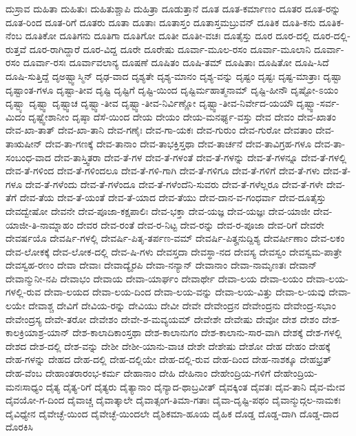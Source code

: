 {ದುಸ್ರಾವ
ದುಹಿತಾ
ದುಹಿತುಃ
ದುಹಿತುಶ್ಚಾಪಿ
ದುಹಿತ್ರಾ
ದೂಡುತ್ತಾನೆ
ದೂತ
ದೂತ-ಕರ್ಮಾಣಂ
ದೂತರ
ದೂತ-ರನ್ನು
ದೂತ-ರಿಂದ
ದೂತ-ರಿಗೆ
ದೂತರು
ದೂತಾ
ದೂತಾಃ
ದೂತಾಸ್ತಂ
ದೂತಾಸ್ತಮಬ್ರುವನ್
ದೂತಿಕ
ದೂತಿ-ಕನು
ದೂತಿಕ-ನೆಂಬ
ದೂತಿಕೋ
ದೂತಿಗನು
ದೂತಿಗಾ
ದೂತಿಗೋ
ದೂತೀ
ದೂತೀ-ವಚಃ
ದೂತೈಸ್ತು
ದೂರ
ದೂರ-ದಲ್ಲಿ
ದೂರ-ದಲ್ಲಿ-ರುತ್ತವೆ
ದೂರ-ರಾಗಿದ್ದಾರೆ
ದೂರ-ವಿದ್ದ
ದೂರೇ
ದೂರೇಷು
ದೂರ್ವಾ-ಮೂಲ-ರಸಂ
ದೂರ್ವಾ-ಮೂಲಾನಿ
ದೂರ್ವಾ-ರಸಂ
ದೂರ್ವಾ-ರಸಃ
ದೂರ್ವಾವಲಾನ್ಯ
ದೂಷಣೆ
ದೂಷಿತಂ
ದೂಷಿ-ತಮ್
ದೂಷಿತಾಃ
ದೂಷಿತೋ
ದೂಷಿ-ಸಿದೆ
ದೂಷಿ-ಸುತ್ತಿದ್ದೆ
ದೃಅಷ್ಟ್ವಾಸ್ಮಿನ್
ದೃಢ-ವಾದ
ದೃಶ್ಯತೇ
ದೃಶ್ಯ-ಮಾನಂ
ದೃಶ್ಯ-ವನ್ನು
ದೃಷ್ಟಂ
ದೃಷ್ಟಃ
ದೃಷ್ಟ-ಮಾತ್ರಾಃ
ದೃಷ್ಟಾ
ದೃಷ್ಟಾಂತ-ಗಳೂ
ದೃಷ್ಟಾ-ತೀವ
ದೃಷ್ಟಿ
ದೃಷ್ಟಿಗೆ
ದೃಷ್ಟಿ-ಯಿಂದ
ದೃಷ್ಟಿರ್ಮಹಾತ್ಮನಾಮ್
ದೃಷ್ಟಿ-ಹೀನೌ
ದೃಷ್ಟೋ-ಽಯಂ
ದೃಷ್ಟ್ಯಾ
ದೃಷ್ಟ್ವಾ
ದೃಷ್ಟ್ವಾಚ
ದೃಷ್ಟ್ವಾ-ತೀವ
ದೃಷ್ಟ್ವಾ-ತೀವ-ನಿರ್ವಿಣ್ಣೋ
ದೃಷ್ಟ್ವಾ-ತೀವ-ನಿರ್ವೇದ-ಯಯೌ
ದೃಷ್ಟ್ವಾ-ಸರ್ವ-ಮಿದಂ
ದೃಷ್ಟ್ವೇಶಾನೀಂ
ದೃಷ್ಠಾ
ದೆಸೆ-ಯಿಂದ
ದೇಯ
ದೇಯಂ
ದೇಯ-ಮನರ್ಘ್ಯ-ವಸ್ತು
ದೇವ
ದೇವಂ
ದೇವ-ಖಾತಂ
ದೇವ-ಖಾ-ತಾತ್
ದೇವ-ಖಾ-ತಾನಿ
ದೇವ-ಗಣೈಃ
ದೇವ-ಗಾ-ಯಕಃ
ದೇವ-ಗುರುಂ
ದೇವ-ಗುರೋ
ದೇವತಾಂ
ದೇವ-ತಾಋಷೀನ್
ದೇವ-ತಾ-ಗಣಕ್ಕೆ
ದೇವ-ತಾನಾಂ
ದೇವ-ತಾಭಕ್ತಿಸ್ತಥಾ
ದೇವ-ತಾರ್ಚನೆ
ದೇವ-ತಾವಿಗ್ರಹ-ಗಳೂ
ದೇವ-ತಾ-ಸಂಬಂಧ-ವಾದ
ದೇವ-ತಾಸ್ತ್ವಿತರಾ
ದೇವ-ತೆ-ಗಳ
ದೇವ-ತೆ-ಗಳಂತೆ
ದೇವ-ತೆ-ಗಳನ್ನು
ದೇವ-ತೆ-ಗಳನ್ನೂ
ದೇವ-ತೆ-ಗಳಲ್ಲಿ
ದೇವ-ತೆ-ಗಳಿಂದ
ದೇವ-ತೆ-ಗಳಿಂದಲೂ
ದೇವ-ತೆ-ಗಳಿ-ಗಾಗಿ
ದೇವ-ತೆ-ಗಳಿಗೂ
ದೇವ-ತೆ-ಗಳಿಗೆ
ದೇವ-ತೆ-ಗಳು
ದೇವ-ತೆ-ಗಳೂ
ದೇವ-ತೆ-ಗಳೆಂದು
ದೇವ-ತೆ-ಗಳೆಂದೂ
ದೇವ-ತೆ-ಗಳೆಂದೆನಿ-ಸುವರು
ದೇವ-ತೆ-ಗಳೆಲ್ಲರೂ
ದೇವ-ತೆ-ಗಳೇ
ದೇವ-ತೆಗೆ
ದೇವ-ತೆಯ
ದೇವ-ತೆ-ಯಂತೆ
ದೇವ-ತೆ-ಯಾದ
ದೇವ-ತೆಯು
ದೇವ-ದಾನ-ವ-ಗಂಧರ್ವಾ
ದೇವ-ದೂತೈಸ್ತು
ದೇವದ್ವೇಷೋ
ದೇವನೇ
ದೇವ-ಪೂಜಾ-ಕಕ್ಷಪಾಲಿಃ
ದೇವ-ಭಕ್ತಾ
ದೇವ-ಯಜ್ಞ
ದೇವ-ಯಜ್ಞಃ
ದೇವ-ಯಾಜೀ
ದೇವ-ಯಾಜೀ-ತಿ-ನಾಮ್ನಾಹಂ
ದೇವರ
ದೇವ-ರಂತೆ
ದೇವ-ರ-ನಿಟ್ಟ
ದೇವ-ರನ್ನು
ದೇವ-ರ-ಪೂಜಾ
ದೇವ-ರಿಗೆ
ದೇವರೇ
ದೇವರ್ಷಯೊ
ದೇವರ್ಷಿ-ಗಳಲ್ಲಿ
ದೇವರ್ಷಿ-ಪಿತೃ-ತರ್ಪಣ-ವಮ್
ದೇವರ್ಷಿ-ಪಿತೄನುದ್ದಿಶ್ಯ
ದೇವರ್ಷೀಣಾಂ
ದೇವ-ಲಕಂ
ದೇವ-ಲೋಕಕ್ಕೆ
ದೇವ-ಲೋಕ-ದಲ್ಲಿ
ದೇವ-ಷಿ-ಗಳು
ದೇವಸ್ತದಾ
ದೇವಸ್ಥಾ-ನದ
ದೇವಸ್ಯ
ದೇವಸ್ವಂ
ದೇವಸ್ವಮ-ಪಾತ್ರೇ
ದೇವಸ್ವಹ-ರಣಂ
ದೇವಾ
ದೇವಾಃ
ದೇವಾದ್ಯೈರಪಿ
ದೇವಾ-ನನ್ಯಾನ್
ದೇವಾನಾಂ
ದೇವಾ-ನಾಮೃಣತಃ
ದೇವಾನ್
ದೇವಾನ್ಮುನೀ-ನಪಿ
ದೇವಾಭಂ
ದೇವಾಯ
ದೇವಾ-ಯಾರ್ಘಂ
ದೇವಾರ್ಥೇ
ದೇವಾ-ಲಯ
ದೇವಾ-ಲಯಂ
ದೇವಾ-ಲಯ-ಗಳಲ್ಲಿ-ರುವ
ದೇವಾ-ಲಯದ
ದೇವಾ-ಲಯ-ದಿಂದ
ದೇವಾ-ಲಯ-ವನ್ನು
ದೇವಾ-ಲಯ-ವಿತ್ತು
ದೇವಾ-ಲ-ಯವು
ದೇವಾ-ಲಯೇ
ದೇವಾಶ್ಚ
ದೇವಿಗೆ
ದೇವಿಯ-ರನ್ನು
ದೇವಿಯು
ದೇವೀ
ದೇವೇ
ದೇವೇಂದ್ರನ
ದೇವೇಂದ್ರನು
ದೇವೇಂದ್ರ-ಸಭಾಂ
ದೇವೇಂದ್ರಸ್ಯ
ದೇವೇ-ತರೋ
ದೇವೇಶಂ
ದೇವೇ-ಶ-ಮವ್ಯಯಮ್
ದೇವೇಶೇ
ದೇವೇಷು
ದೇವೋ
ದೇಶ
ದೇಶಂ
ದೇಶ-ಕಾಲಕ್ರಿಯಾಶ್ರ-ಯಾನ್
ದೇಶ-ಕಾಲಾದಿಕಾಂಸ್ತಥಾ
ದೇಶ-ಕಾಲಾನುಗಂ
ದೇಶ-ಕಾಲಾನು-ಸಾರ-ವಾಗಿ
ದೇಶಕ್ಕೆ
ದೇಶ-ಗಳಲ್ಲಿ
ದೇಶದ
ದೇಶ-ದಲ್ಲಿ
ದೇಶ-ವನ್ನು
ದೇಶೀ
ದೇಶೀ-ಯಾನು-ವಾಚ
ದೇಶೇ
ದೇಶೇಷು
ದೇಶೋ
ದೇಹ
ದೇಹಂ
ದೇಹಕ್ಕೆ
ದೇಹ-ಗಳನ್ನು
ದೇಹದ
ದೇಹ-ದಲ್ಲಿ
ದೇಹ-ದಲ್ಲಿಯೇ
ದೇಹ-ದಲ್ಲಿ-ರುವ
ದೇಹ-ದಿಂದ
ದೇಹ-ನಾಶಕ್ಕೂ
ದೇಹಭ್ರತ್
ದೇಹ-ವೆಂಬ
ದೇಹಾಂತರಾರಂಭ-ಕರ್ಮ
ದೇಹಾನಾಂ
ದೇಹಿ
ದೇಹಿನಾಂ
ದೇಹೇಂದ್ರಿಯ-ಗಳಿಗೆ
ದೇಹೇಂದ್ರಿಯ-ಮನಃಸಾಧ್ಯಂ
ದೈತ್ಯ
ದೈತ್ಯ-ರಿಗೆ
ದೈತ್ಯರು
ದೈತ್ಯಾನಾಂ
ದೈನ್ಯಾದ-ಥಾಬ್ರವೀತ್
ದೈವಕ್ಕಿಂತ
ದೈವತಃ
ದೈವ-ತಾನಿ
ದೈವ-ಮೇವ
ದೈವಯೋ-ಗ-ದಿಂದ
ದೈವಾಚ್ಚ
ದೈವಾತ್ಕಾಲೇ
ದೈವಾತ್ಸಂಗ-ತಿಮಾ-ಗತಾಃ
ದೈವಾ-ದೃಷ್ಟಿ-ಪಥಂ
ದೈವಾನ್ಮುದ್ಗಲ-ನಾಮಕಃ
ದೈವಿಧ್ಯೇನ
ದೈವೇಚ್ಛೆ-ಯಿಂದ
ದೈವೇಚ್ಛೆ-ಯಿಂದಲೇ
ದೈಶಿಕಮಾ-ಹೂಯ
ದೈಹಿಕ
ದೊಡ್ಡ
ದೊಡ್ಡ-ದಾಗಿ
ದೊಡ್ಡ-ದಾದ
ದೊರಕಿಸಿ
}
